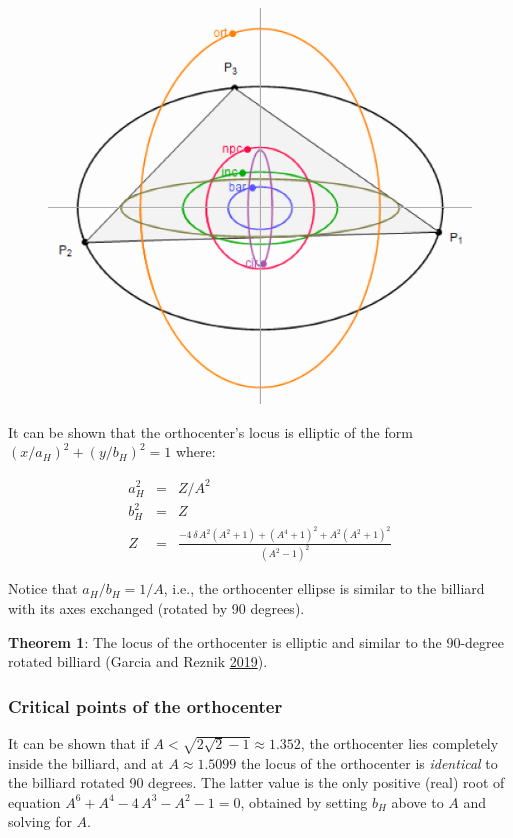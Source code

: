 \documentclass[]{article}
\begin{document}
\begin{figure}[H]

{\centering \includegraphics[width=0.5\linewidth]{pics/orthocenter_locus} 

}

\end{figure}

It can be shown that the orthocenter's locus is elliptic of the form \((x/a_H)^2+(y/b_H)^2=1\) where:

\[
\begin{array}{rcl}
a_H^2 & = & Z/A^2 \\
b_H^2 & = & Z \\
Z & = &  {\frac {-4\,\delta\,{A}^{2} \left( {A}^{2}+1 \right)+ \left( {A}^{4}+1 \right) ^{2}+{A}^{2
} \left( {A}^{2}+1 \right) ^{2}}{ \left( {A}^{2}-1 \right) ^{2}}}
\end{array}
\]

Notice that \(a_H/b_H=1/A\), i.e., the orthocenter ellipse is similar to the billiard with its axes exchanged (rotated by 90 degrees).

\textbf{Theorem 1}: The locus of the orthocenter is elliptic and similar to the 90-degree rotated billiard (Garcia and Reznik \protect\hyperlink{ref-garcia19a}{2019}).

\hypertarget{critical-points-of-the-orthocenter}{%
\subsubsection{Critical points of the orthocenter}\label{critical-points-of-the-orthocenter}}

It can be shown that if \(A<\sqrt{2 \sqrt{2}-1}\approx 1.352\), the orthocenter lies completely inside the billiard, and at \(A\approx 1.5099\) the locus of the orthocenter is \emph{identical} to the billiard rotated 90 degrees. The latter value is the only positive (real) root of equation \(A^6 + A^4 - 4\,A^3-A^2-1=0\), obtained by setting \(b_H\) above to \(A\) and solving for \(A\).
\end{document}
